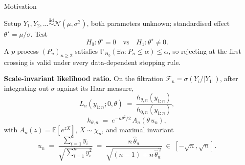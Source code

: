 \documentclass[final]{beamer}
\newcommand{\E}{\mathbb{E}}
\newcommand{\Prob}{\mathbb{P}}
\newcommand{\thetahat}{\widehat{\theta}_n}
\newlength{\colwidth}
\begin{document}
\begin{frame}[t]
\begin{columns}[t]
\begin{column}{\colwidth}
\begin{block}{Motivation}
\end{block}
  \begin{block}{Setup}
$Y_1,Y_2,\ldots\stackrel{\mathrm{iid}}{\sim}\mathcal N(\mu,\sigma^2)$, both parameters unknown; standardised effect $\theta^\star=\mu/\sigma$. Test
    \[
      H_0\colon\theta^\star=0 \quad\text{vs}\quad H_1\colon\theta^\star\neq 0.
    \]
    A \alert{$p$-process} $(P_n)_{n\ge 2}$ satisfies $\Prob_{H_0}(\exists n\colon P_n\le\alpha)\le\alpha$, so rejecting at the first crossing is valid under every data-dependent stopping rule.
    
    \textbf{Scale-invariant likelihood ratio.} On the filtration $\mathcal F_n=\sigma(Y_i/|Y_1|)$, after integrating out $\sigma$ against its Haar measure,
    \[
      L_n(y_{1:n};0,\theta) \;=\; \frac{h_{\theta,n}(y_{1:n})}{h_{0,n}(y_{1:n})},\]
      \[
      h_{\theta,n}\;=\;e^{-n\theta^{2}/2}\,A_n(\theta\,u_n),
    \]
    with $A_n(z)=\E[e^{zX}]$, $X\sim\chi_n$, and maximal invariant
    \[
      u_n \;=\; \frac{\sum_{i=1}^n y_i}{\sqrt{\sum_{i=1}^n y_i^{2}}}
           \;=\; \frac{n\,\thetahat}{\sqrt{(n-1)+n\,\thetahat^{\,2}}}\;\in\;[-\sqrt n,\sqrt n].
    \]


\end{block}
\end{column}
\end{columns}
\end{frame}
\end{document}

